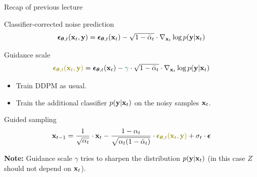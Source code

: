 \begin{frame}{Recap of previous lecture}
	\begin{block}{Classifier-corrected noise prediction}
		\vspace{-0.3cm}
		\[
			\boldsymbol{\epsilon}_{\boldsymbol{\theta}, t}(\mathbf{x}_t, \mathbf{y}) = \boldsymbol{\epsilon}_{\boldsymbol{\theta}, t}(\mathbf{x}_t) - \sqrt{1 - \bar{\alpha}_t} \cdot \nabla_{\mathbf{x}_t} \log p(\mathbf{y} | \mathbf{x}_t)
		\]
		\vspace{-0.5cm}
	\end{block}
	\begin{block}{Guidance scale}
		\vspace{-0.3cm}
		\[
			{\color{olive}\bepsilon_{\btheta, t}(\bx_t, \by)} = \bepsilon_{\btheta, t}(\bx_t) - {\color{teal}\gamma} \cdot \sqrt{1 - \bar{\alpha}_t} \cdot \nabla_{\bx_t} \log p(\by | \bx_t)
		\]
		\vspace{-0.5cm}
	\end{block}
	\begin{itemize}
		\item Train DDPM as usual.
		\item Train the additional classifier $p(\mathbf{y} | \mathbf{x}_t)$ on the noisy samples $\mathbf{x}_t$.
	\end{itemize}
	\begin{block}{Guided sampling}
		\vspace{-0.3cm}
		\[
			\bx_{t-1} = \frac{1}{\sqrt{\alpha_t}} \cdot \bx_t - \frac{1 - \alpha_t}{\sqrt{\alpha_t (1 - \bar{\alpha}_t)}} \cdot  {\color{olive}\bepsilon_{\btheta, t}(\bx_t, \by)} + \sigma_t \cdot \bepsilon
		\]
		\vspace{-0.3cm}
	\end{block}
	\textbf{Note:} Guidance scale $\gamma$ tries to sharpen the distribution $p(\mathbf{y} | \mathbf{x}_t)$ (in this case $Z$ should not depend on $\mathbf{x}_t$).
\end{frame}

